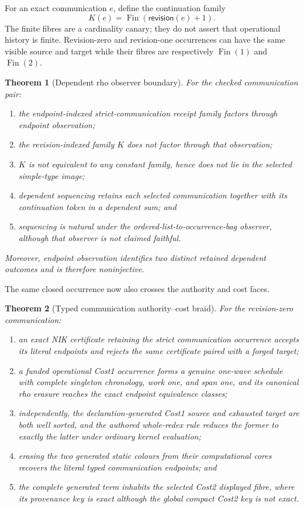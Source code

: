 \documentclass[11pt]{article}
\newtheorem{theorem}{Theorem}
\theoremstyle{definition}
\theoremstyle{remark}
\begin{document}
For an exact communication $e$, define the continuation family
\[
  K(e)=\operatorname{Fin}(\mathsf{revision}(e)+1).
\]
The finite fibres are a cardinality canary; they do not assert that operational
history is finite.  Revision-zero and revision-one occurrences can have the
same visible source and target while their fibres are respectively
$\operatorname{Fin}(1)$ and $\operatorname{Fin}(2)$.

\begin{theorem}[Dependent rho observer boundary]
For the checked communication pair:
\begin{enumerate}[label=(\roman*)]
\item the endpoint-indexed strict-communication receipt family factors through
  endpoint observation;
\item the revision-indexed family $K$ does not factor through that observation;
\item $K$ is not equivalent to any constant family, hence does not lie in the
  selected simple-type image;
\item dependent sequencing retains each selected communication together with
  its continuation token in a dependent sum; and
\item sequencing is natural under the ordered-list-to-occurrence-bag observer,
  although that observer is not claimed faithful.
\end{enumerate}
Moreover, endpoint observation identifies two distinct retained dependent
outcomes and is therefore noninjective.
\end{theorem}

The same closed occurrence now also crosses the authority and cost faces.

\begin{theorem}[Typed communication authority--cost braid]
For the revision-zero communication:
\begin{enumerate}[label=(\roman*)]
\item an exact NIK certificate retaining the strict communication occurrence
  accepts its literal endpoints and rejects the same certificate paired with a
  forged target;
\item a funded operational Cost1 occurrence forms a genuine one-wave schedule
  with complete singleton chronology, work one, and span one, and its canonical
  rho erasure reaches the exact endpoint equivalence classes;
\item independently, the declaration-generated Cost1 source and exhausted
  target are both well sorted, and the authored whole-redex rule reduces the
  former to exactly the latter under ordinary kernel evaluation;
\item erasing the two generated static colours from their computational cores
  recovers the literal typed communication endpoints; and
\item the complete generated term inhabits the selected Cost2 displayed fibre,
  where its provenance key is exact although the global compact Cost2 key is
  not exact.
\end{enumerate}
\end{theorem}
\end{document}
